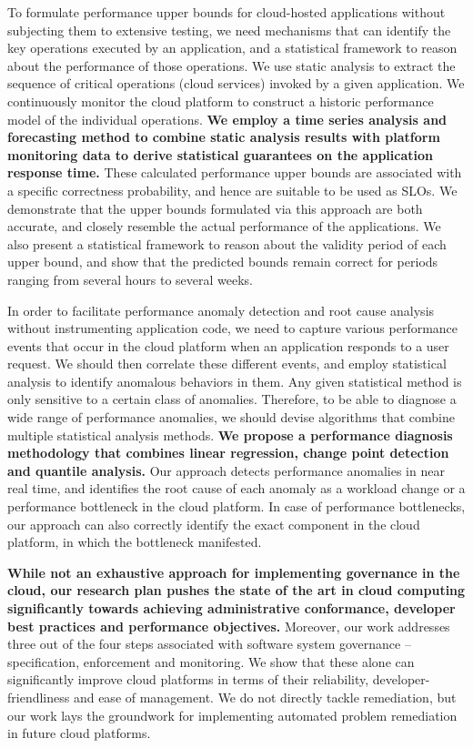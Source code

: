 To formulate performance upper bounds for cloud-hosted applications without subjecting them to extensive testing,
we need mechanisms that can identify the key operations executed by an application, and a
statistical framework to reason about the performance of those operations. We use static
analysis to extract the sequence of critical operations (cloud services) invoked by a given application.
We continuously monitor the cloud platform to construct a historic performance model of the individual operations.
\textbf{We employ a time series analysis and forecasting method to combine static analysis results with
platform monitoring data to
derive statistical guarantees on the application response time.} These calculated performance
upper bounds are associated with a specific correctness probability, and hence are suitable to be used
as SLOs. We demonstrate that the upper bounds formulated via this approach are 
both accurate, and closely resemble the actual performance of the applications. We also present a statistical framework
to reason about the validity period of each upper bound, and show that the predicted bounds
remain correct for periods ranging from several hours to several weeks.

In order to facilitate performance anomaly detection and root cause analysis without instrumenting
application code, we need to capture various performance events that occur in the cloud platform
when an application responds to a user request. We should then correlate these different events,
and employ statistical analysis to identify anomalous behaviors in them. Any given statistical
method is only sensitive to a certain class of anomalies. Therefore, to be able to diagnose a wide range of
performance anomalies, we should devise algorithms that combine multiple statistical analysis
methods. \textbf{We propose a performance diagnosis methodology that combines linear regression, change point
detection and quantile analysis.} Our approach detects performance anomalies in near real time,
and identifies the root cause of each anomaly as a workload change or a performance bottleneck
in the cloud platform. In case of performance bottlenecks, our approach can also correctly identify
the exact component in the cloud platform, in which the bottleneck manifested.

\textbf{While not an exhaustive approach for implementing governance in the cloud, our research plan
pushes the state of the art in cloud computing significantly towards achieving
administrative conformance, developer best practices and performance objectives.} Moreover,
our work addresses three out of the four steps associated with software system governance --
specification, enforcement and monitoring. We show that these alone can significantly improve cloud platforms
in terms of their reliability, developer-friendliness and ease of management. 
We do not directly tackle remediation, but our work
lays the groundwork for implementing automated problem remediation in future cloud platforms.

